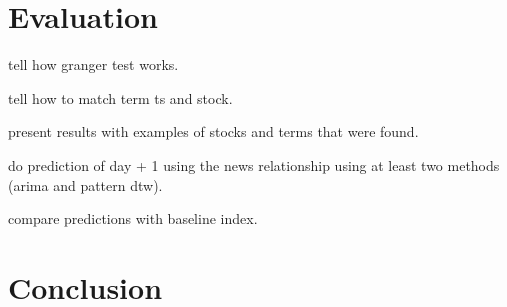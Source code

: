 \documentclass{article}
\begin{document}
\section{Evaluation}
tell how granger test works.

tell how to match term ts and stock.

present results with examples of stocks and terms that were found.

do prediction of day + 1 using the news relationship using at least two methods (arima and pattern dtw).

compare predictions with baseline index.
\section{Conclusion}

\end{document}
